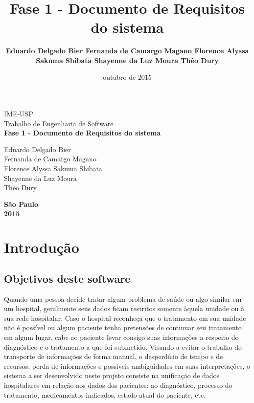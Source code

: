 \documentclass[11pt,a4paper]{report}
\author{\textbf{
 Eduardo Delgado Bier
 Fernanda de Camargo Magano 
 Florence Alyssa Sakuma Shibata 
 Shayenne da Luz Moura 
 Théo Dury }}
\title{\textbf{Fase 1 - Documento de Requisitos do sistema}}
\date{outubro de 2015}
\begin{document}
\begin{titlepage}

\begin{center}
{\large IME-USP}\\[0.2cm]
{\large Trabalho de Engenharia de Software}\\[5.1cm]
{\bf \huge Fase 1 - Documento de Requisitos do sistema}\\[5.1cm]
\end{center}


\begin{flushright}

 Eduardo Delgado Bier \\
 Fernanda de Camargo Magano \\
 Florence Alyssa Sakuma Shibata \\
 Shayenne da Luz Moura \\
 Théo Dury \\
 
\end{flushright}

\begin{center}
{\large \textbf{São Paulo}}\\[0.2cm]
{\large \textbf{2015}} \\[0.2cm]
\end{center}

\end{titlepage}

\tableofcontents

\newpage

\chapter*{Introdução}

\section{Objetivos deste software}

Quando uma pessoa decide tratar algum problema de saúde ou algo similar em um hospital, geralmente seus dados ficam restritos somente àquela unidade ou à sua rede hospitalar. Caso o hospital reconheça que o tratamento em sua unidade não é possível ou algum paciente tenha pretensões de continuar seu tratamento em algum lugar, cabe ao paciente levar consigo suas informações a respeito do diagnóstico e o tratamento a que foi submetido.
Visando a evitar o trabalho de transporte de informações de forma manual, o desperdício de tempo e de recursos, perda de informações e possíveis ambiguidades em suas interpretações, o sistema a ser desenvolvido neste projeto consiste na unificação de dados hospitalares em relação aos dados dos pacientes: ao diagnóstico, processo do tratamento, medicamentos indicados, estado atual do paciente, etc.
\end{document}
